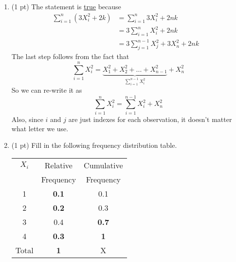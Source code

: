 \documentclass{./../../Latex/handout}
\begin{document}
\thispagestyle{plain}


\begin{enumerate}
\setlength\itemsep{2em}

\item (1 pt) The statement is \underline{true} because 
\begin{align*} \sum_{i=1}^n (3X_i^2 + 2k) &=  \sum_{i=1}^n 3 X_i^2 + 2nk \\
&= 3 \sum_{i=1}^n  X_i^2 + 2nk  \\
&= 3 \sum_{j=1}^{n-1} X^2_j + 3X^2_n  + 2nk  &
\end{align*} 
The last step follows from the fact that 
$$ \sum_{i=1}^n X^2_i = \underbrace{X^2_1 + X^2_2 + ... + X^2_{n-1}}_{\sum_{i=1}^{n-1} X^2_i} + X^2_n $$
So we can re-write it as 
$$  \sum_{i=1}^n X^2_i  = \sum_{i=1}^{n-1} X_i^2 + X_n^2 $$ 
Also, since $i$ and $j$ are just indexes for each observation, it doesn't matter what letter we use. 

\item (1 pt) Fill in the following frequency distribution table. 
\begin{center}
\begin{tabular}{|c|c|c|}
\hline
$X_i$ & Relative & Cumulative \\
& Frequency & Frequency \\
\hline
1 & \textbf{0.1} & 0.1 \\
\hline
2 & \textbf{0.2}  & 0.3 \\
\hline
3 & 0.4 & \textbf{0.7}   \\
\hline
4 & \textbf{0.3} & \textbf{1} \\
\hline
Total & \textbf{1}  & X \\
\hline
\end{tabular}
\end{center}


\end{enumerate}
\end{document}

